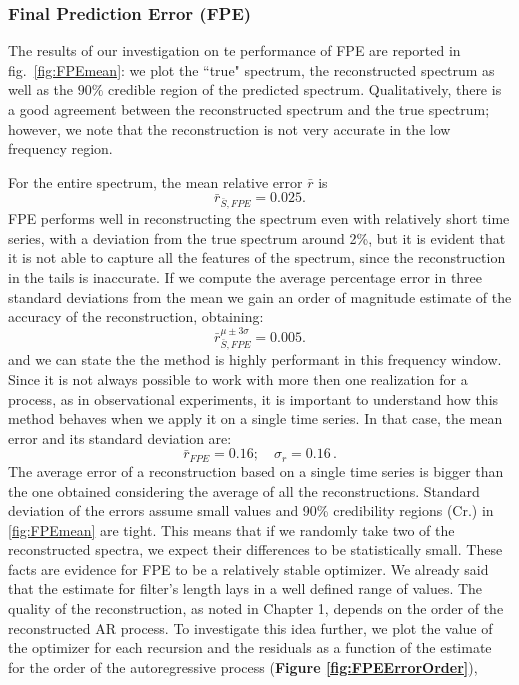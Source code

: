 \documentclass[twocolumn,showpacs,preprintnumbers,nofootinbib,prd,
superscriptaddress,10pt]{revtex4-1}
\begin{document}
\subsubsection{Final Prediction Error (FPE)}
The results of our investigation on te performance of FPE are reported in fig.~\ref{fig:FPEmean}: we plot the ``true" spectrum, the reconstructed spectrum as well as the $90\%$ credible region of the predicted spectrum.
Qualitatively, there is a good agreement between the reconstructed spectrum and the true spectrum; however, we note that the reconstruction is not very accurate in the low frequency region. 

For the entire spectrum, the mean relative error $\bar{r}$ is 
\begin{equation}  
    \bar{r}_{\bar S, FPE} = 0.025.
\end{equation}
FPE performs well in reconstructing the spectrum even with relatively short time series, with a deviation from the true spectrum around 2\%, but it is evident that it is not able to capture all the features of the spectrum, since the reconstruction in the tails is inaccurate. If we compute the average percentage error in three standard deviations from the mean we gain an order of magnitude estimate of the accuracy of the reconstruction, obtaining: 
\begin{equation}
    \nonumber
    \bar{r}_{\bar S, FPE}^{\mu \pm 3\sigma} = 0.005. 
\end{equation}
and we can state the the method is highly performant in this frequency window. 
Since it is not always possible to work with more then one realization for a process, as in observational experiments, it is important to understand how this method behaves when we apply it on a single time series. In that case, the mean error and its standard deviation are: 
\begin{equation}
    \nonumber
    \bar r_{FPE} = 0.16; \quad \sigma_{r} = 0.16\,.
\end{equation}
The average error of a reconstruction based on a single time series is bigger than the one obtained considering the average of all the reconstructions.
Standard deviation of the errors assume small values and 90\% credibility regions (Cr.) in \ref{fig:FPEmean} are tight. This means that if we randomly take two of the reconstructed spectra, we expect their differences to be statistically small. These facts are evidence for FPE to be a relatively stable optimizer. 
We already said that the estimate for filter's length lays in a well defined range of values. The quality of the reconstruction, as noted in Chapter 1, depends on the order of the reconstructed AR process. 
To investigate this idea further, we plot the value of the optimizer for each recursion and the residuals as a function of the estimate for the order of the autoregressive process (\textbf{Figure \ref{fig:FPEErrorOrder}}),
\end{document}
